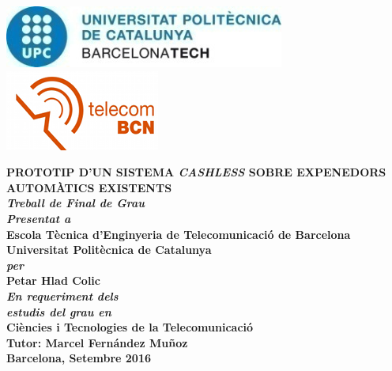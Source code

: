 \documentclass[12pt,a4paper,twoside,openright]{book}
\begin{document}
\newcommand{\titol}{Prototip d'un sistema \textit{cashless} sobre expenedors automàtics existents}
\newcommand{\shortitol}{Short title}
\newcommand{\autor}{Petar Hlad Colic}
\renewcommand{\cleardoublepage}{}

\frontmatter
\begin{titlepage}
   	\includegraphics[scale=1]{images/logoUPC.jpg}
   	\hfill
   	\includegraphics[scale=1]{images/logoETSETB.jpg}\\

   	\begin{center}
   	\vspace{1em}
   	\LARGE\textbf{\MakeUppercase{\titol}} \\
   	\vspace{2em}
   	\large\textit{\textbf{Treball de Final de Grau}}\\
   	\large\textit{\textbf{Presentat a}}\\
   	\vspace{0.5em}
   	\Large\textbf{Escola Tècnica d'Enginyeria de Telecomunicació de Barcelona}\\
   	\vspace{0.5em}
   	\Large\textbf{Universitat Politècnica de Catalunya}\\
   	\vspace{1em}
   	\large\textit{\textbf{per}}\\
   	\LARGE\textbf{\autor}\\
   	\vspace{2em}
   	\large\textit{\textbf{En requeriment dels}}\\
   	\large\textit{\textbf{estudis del grau en}}\\
   	\vspace{0.5em}
   	\Large\textbf{Ciències i Tecnologies de la Telecomunicació}\\
   	\vspace{4em}
   	\Large\textbf{Tutor: Marcel Fernández Muñoz}\\
   	\vspace{3em}
   	\large\textbf{Barcelona, Setembre 2016}\\
   	\end{center}
\end{titlepage} 
\newpage{\cleardoublepage}
\end{document}
